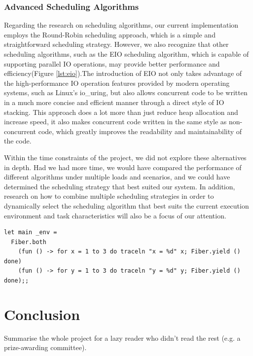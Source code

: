 \documentclass{l4proj}
\begin{document}
\subsection{Advanced Scheduling Algorithms}

Regarding the research on scheduling algorithms, our current implementation employs the Round-Robin scheduling approach, which is a simple and straightforward scheduling strategy. However, we also recognize that other scheduling algorithms, such as the EIO scheduling algorithm, which is capable of supporting parallel IO operations, may provide better performance and efficiency(Figure \ref{lst:eio}).The introduction of EIO not only takes advantage of the high-performance IO operation features provided by modern operating systems, such as Linux's io\_uring, but also allows concurrent code to be written in a much more concise and efficient manner through a direct style of IO stacking. This approach does a lot more than just reduce heap allocation and increase speed, it also makes concurrent code written in the same style as non-concurrent code, which greatly improves the readability and maintainability of the code.

Within the time constraints of the project, we did not explore these alternatives in depth. Had we had more time, we would have compared the performance of different algorithms under multiple loads and scenarios, and we could have determined the scheduling strategy that best suited our system. In addition, research on how to combine multiple scheduling strategies in order to dynamically select the scheduling algorithm that best suits the current execution environment and task characteristics will also be a focus of our attention.

\noindent\begin{minipage}{\linewidth}
\lstset{style=ocamlstyle}
\begin{lstlisting}[caption={Example of running two threads of execution concurrently using Eio.Fiber \colorbox{yellow}{referenceHere}}, label={lst:eio}]
let main _env =
  Fiber.both
    (fun () -> for x = 1 to 3 do traceln "x = %d" x; Fiber.yield () done)
    (fun () -> for y = 1 to 3 do traceln "y = %d" y; Fiber.yield () done);;
\end{lstlisting}
\end{minipage}


\chapter{Conclusion}    
Summarise the whole project for a lazy reader who didn't read the rest (e.g. a prize-awarding committee).
\end{document}
